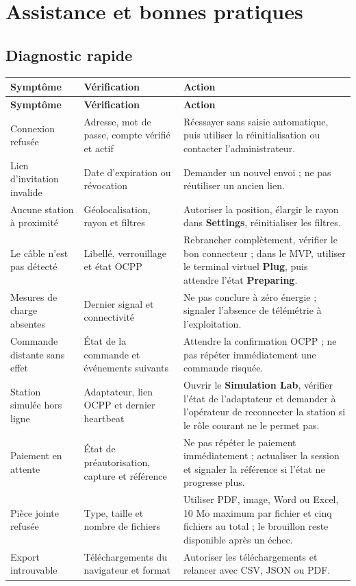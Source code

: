 \chapter{Assistance et bonnes pratiques}

\section{Diagnostic rapide}

\begin{longtable}{|L{4cm}|L{5.2cm}|L{6.3cm}|}
  \hline
  \textbf{Symptôme} & \textbf{Vérification} & \textbf{Action} \\ \hline
  \endfirsthead
  \hline
  \textbf{Symptôme} & \textbf{Vérification} & \textbf{Action} \\ \hline
  \endhead
  Connexion refusée & Adresse, mot de passe, compte vérifié et actif &
  Réessayer sans saisie automatique, puis utiliser la réinitialisation ou
  contacter l'administrateur. \\ \hline
  Lien d'invitation invalide & Date d'expiration ou révocation & Demander un
  nouvel envoi ; ne pas réutiliser un ancien lien. \\ \hline
  Aucune station à proximité & Géolocalisation, rayon et filtres & Autoriser la
  position, élargir le rayon dans \textbf{Settings}, réinitialiser les filtres. \\ \hline
  Le câble n'est pas détecté & Libellé, verrouillage et état OCPP & Rebrancher
  complètement, vérifier le bon connecteur ; dans le MVP, utiliser le terminal
  virtuel \textbf{Plug}, puis attendre l'état \textbf{Preparing}. \\ \hline
  Mesures de charge absentes & Dernier signal et connectivité & Ne pas conclure à
  zéro énergie ; signaler l'absence de télémétrie à l'exploitation. \\ \hline
  Commande distante sans effet & État de la commande et événements suivants &
  Attendre la confirmation OCPP ; ne pas répéter immédiatement une commande
  risquée. \\ \hline
  Station simulée hors ligne & Adaptateur, lien OCPP et dernier heartbeat &
  Ouvrir le \textbf{Simulation Lab}, vérifier l'état de l'adaptateur et demander
  à l'opérateur de reconnecter la station si le rôle courant ne le permet pas. \\ \hline
  Paiement en attente & État de préautorisation, capture et référence & Ne pas
  répéter le paiement immédiatement ; actualiser la session et signaler la
  référence si l'état ne progresse plus. \\ \hline
  Pièce jointe refusée & Type, taille et nombre de fichiers & Utiliser PDF,
  image, Word ou Excel, 10 Mo maximum par fichier et cinq fichiers au total ; le
  brouillon reste disponible après un échec. \\ \hline
  Export introuvable & Téléchargements du navigateur et format & Autoriser les
  téléchargements et relancer avec CSV, JSON ou PDF. \\ \hline
\end{longtable}

